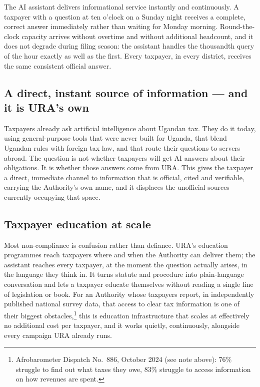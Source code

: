 \documentclass[11pt,a4paper]{article}
\begin{document}
The AI assistant delivers informational service instantly and continuously. A taxpayer with a question at ten o'clock on a Sunday night receives a complete, correct answer immediately rather than waiting for Monday morning. Round-the-clock capacity arrives without overtime and without additional headcount, and it does not degrade during filing season: the assistant handles the thousandth query of the hour exactly as well as the first. Every taxpayer, in every district, receives the same consistent official answer.

\subsection*{A direct, instant source of information --- and it is URA's own}

Taxpayers already ask artificial intelligence about Ugandan tax. They do it today, using general-purpose tools that were never built for Uganda, that blend Ugandan rules with foreign tax law, and that route their questions to servers abroad. The question is not whether taxpayers will get AI answers about their obligations. It is whether those answers come from URA. This gives the taxpayer a direct, immediate channel to information that is official, cited and verifiable, carrying the Authority's own name, and it displaces the unofficial sources currently occupying that space.

\subsection*{Taxpayer education at scale}

Most non-compliance is confusion rather than defiance. URA's education programmes reach taxpayers where and when the Authority can deliver them; the assistant reaches every taxpayer, at the moment the question actually arises, in the language they think in. It turns statute and procedure into plain-language conversation and lets a taxpayer educate themselves without reading a single line of legislation or book. For an Authority whose taxpayers report, in independently published national survey data, that access to clear tax information is one of their biggest obstacles,\footnote{Afrobarometer Dispatch No.\ 886, October 2024 (see note above): 76\% struggle to find out what taxes they owe, 83\% struggle to access information on how revenues are spent.} this is education infrastructure that scales at effectively no additional cost per taxpayer, and it works quietly, continuously, alongside every campaign URA already runs.
\end{document}
